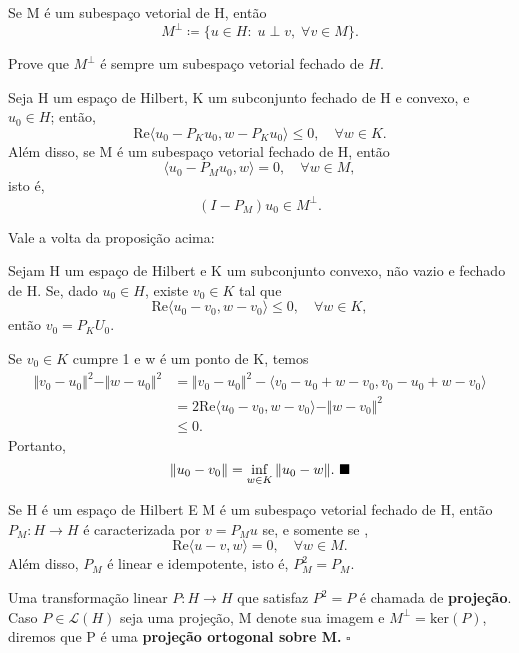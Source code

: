 \documentclass[../functional_analysis.tex]{subfiles}
\begin{document}
Se M é um subespaço vetorial de H, então
\[
	M^{\perp } \coloneqq \{u\in H:\; u\perp v,\; \forall v\in M\}.
\]
\begin{exr}
	Prove que \(M^{\perp }\) é sempre um subespaço vetorial fechado de \(H.\)
\end{exr}
\begin{prop*}
	Seja H um espaço de Hilbert, K um subconjunto fechado de H e convexo, e \(u_{0}\in H\); então,
	\[
		\mathrm{Re}\langle u_{0} - P_{K}u_{0}, w-P_{K}u_{0} \rangle \leq 0,\quad \forall w\in K.
	\]
	Além disso, se M é um subespaço vetorial fechado de H, então
	\[
		\langle u_{0}-P_{M}u_{0}, w \rangle = 0,\quad \forall w\in M,
	\]
	isto é,
	\[
		(I-P_{M})u_{0}\in M^{\perp }.
	\]
\end{prop*}

Vale a volta da proposição acima:
\begin{prop*}
	Sejam H um espaço de Hilbert e K um subconjunto convexo, não vazio e fechado de H. Se, dado \(u_{0}\in H\), existe \(v_{0}\in K\) tal que
	\[
		\mathrm{Re} \langle u_{0}-v_{0}, w-v_{0} \rangle \leq 0,\quad \forall w\in K,
	\]
	então \(v_{0} = P_{K}U_{0}\).
\end{prop*}
\begin{proof*}
	Se \(v_{0}\in K\) cumpre 1 e w é um ponto de K, temos
	\begin{align*}
		\Vert v_{0}-u_{0} \Vert^{2} - \Vert w-u_{0} \Vert^{2} & = \Vert v_{0}-u_{0} \Vert^{2}-\langle v_{0}-u_{0}+w-v_{0}, v_{0}-u_{0}+w-v_{0} \rangle \\
		                                                      & = 2 \mathrm{Re}\langle u_{0}-v_{0}, w-v_{0} \rangle - \Vert w-v_{0} \Vert^{2}          \\
		                                                      & \leq 0.
	\end{align*}
	Portanto,
	\[
		\Vert u_{0}-v_{0} \Vert = \inf_{w\in K}\Vert u_{0}-w \Vert. \text{ $\blacksquare$}
	\]
\end{proof*}
\begin{crl*}
	Se H é um espaço de Hilbert E M é um subespaço vetorial fechado de H, então \(P_M:H\rightarrow H\) é caracterizada por \(v = P_{M}u\) se, e somente se ,
	\[
		\mathrm{Re}\langle u-v, w \rangle = 0,\quad \forall w\in M.
	\]
	Além disso, \(P_{M}\) é linear e idempotente, isto é, \(P_{M}^{2} = P_{M}.\)
\end{crl*}
\begin{def*}
	Uma transformação linear \(P:H\rightarrow H\) que satisfaz \(P^{2} = P\) é chamada de \textbf{projeção}. Caso \(P\in \mathcal{L}(H)\) seja uma projeção, M denote sua imagem e \(M^{\perp } = \mathrm{ker}(P)\), diremos que P é uma \textbf{projeção ortogonal sobre M.} \(\square\)
\end{def*}
\end{document}

